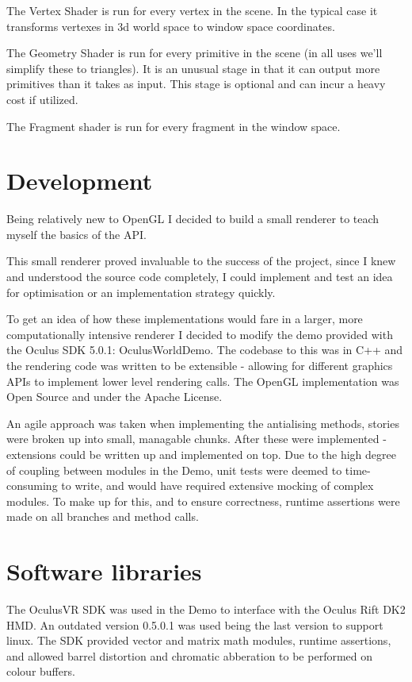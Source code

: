 \documentclass[12pt,a4paper,twoside,openright]{report}
\begin{document}
The Vertex Shader is run for every vertex in the scene. In the typical case it transforms vertexes in 3d world space to window space coordinates.

The Geometry Shader is run for every primitive in the scene (in all uses we'll simplify these to triangles). It is an unusual stage in that it can output more primitives than it takes as input. This stage is optional and can incur a heavy cost if utilized.

The Fragment shader is run for every fragment in the window space.

\section{Development}

Being relatively new to OpenGL I decided to build a small renderer to teach myself the basics of the API.

This small renderer proved invaluable to the success of the project, since I knew and understood the source code completely, I could implement and test an idea for optimisation or an implementation strategy quickly.

To get an idea of how these implementations would fare in a larger, more computationally intensive renderer I decided to modify the demo provided with the Oculus SDK 5.0.1: OculusWorldDemo.
The codebase to this was in C++ and the rendering code was written to be extensible - allowing for different graphics APIs to implement lower level rendering calls. The OpenGL implementation was Open Source and under the Apache License.

An agile approach was taken when implementing the antialising methods, stories were broken up into small, managable chunks. After these were implemented - extensions could be written up and implemented on top.
Due to the high degree of coupling between modules in the Demo, unit tests were deemed to time-consuming to write, and would have required extensive mocking of complex modules.
To make up for this, and to ensure correctness, runtime assertions were made on all branches and method calls.

\section{Software libraries}

The OculusVR SDK was used in the Demo to interface with the Oculus Rift DK2 HMD. An outdated version 0.5.0.1 was used being the last version to support linux.
The SDK provided vector and matrix math modules, runtime assertions, and allowed barrel distortion and chromatic abberation to be performed on colour buffers.
\end{document}
